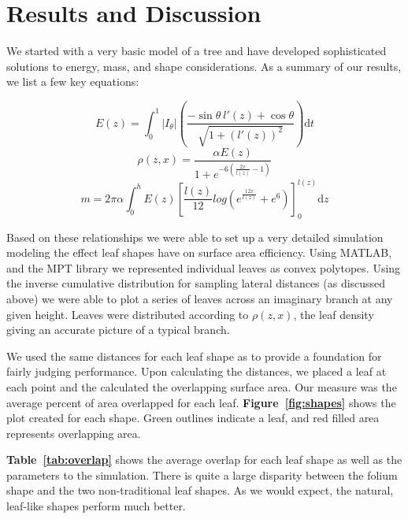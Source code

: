 \documentclass[10pt]{article}
\numberwithin{equation}{subsection}
\begin{document}
\section{Results and Discussion}
We started with a very basic model of a tree and have developed
sophisticated solutions to energy, mass, and shape considerations. As
a summary of our results, we list a few key equations:

\begin{center}
  \begin{equation*}
    E(z) = \int_0^1 |I_\theta|\left(\dfrac{-\sin\theta \  l'(z) + \cos\theta}{\sqrt{1+(l'(z))^2}}\right) \mathrm{d}t
  \end{equation*}
  \begin{equation*}
    \rho(z,x) = \dfrac{\alpha E(z)}{1+e^{-6(\frac{2x}{l(z)}-1)}} 
  \end{equation*}
  \begin{equation*}
    m = 2\pi\alpha \int_0^{h}
      E(z) \left[ \frac{l(z)}{12} log\left( e^{\frac{12x}{l(z)}} + e^6 \right) \right]_0^{l(z)} \mathrm{d}z
  \end{equation*}
\end{center}

Based on these relationships we were able to set up a very detailed
simulation modeling the effect leaf shapes have on surface area
efficiency. Using MATLAB, and the MPT library \citep{mpt} we
represented individual leaves as convex polytopes. Using the inverse
cumulative distribution for sampling lateral distances (as discussed
above) we were able to plot a series of leaves across an imaginary
branch at any given height. Leaves were distributed according to
$\rho(z,x)$, the leaf density giving an accurate picture of a typical
branch.

We used the same distances for each leaf shape as to provide a
foundation for fairly judging performance. Upon calculating the
distances, we placed a leaf at each point and the calculated the
overlapping surface area. Our measure was the average percent of area
overlapped for each leaf. {\bf Figure~\ref{fig:shapes}} shows the plot
created for each shape. Green outlines indicate a leaf, and red filled
area represents overlapping area.

{\bf Table~\ref{tab:overlap}} shows the average overlap for each leaf
shape as well as the parameters to the simulation. There is quite a
large disparity between the folium shape and the two non-traditional
leaf shapes. As we would expect, the natural, leaf-like shapes perform
much better.
\end{document}
